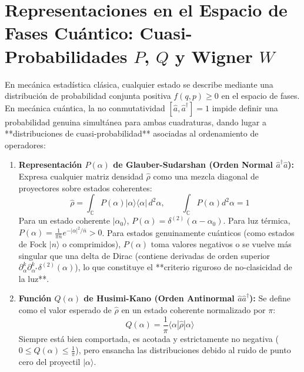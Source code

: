 \documentclass[11pt,a4paper]{book}
\begin{document}
\section[Representaciones cuánticas de fase]{Representaciones en el Espacio de Fases Cuántico: Cuasi-Probabilidades $P$, $Q$ y Wigner $W$}

En mecánica estadística clásica, cualquier estado se describe mediante una distribución de probabilidad conjunta positiva $f(q, p) \geq 0$ en el espacio de fases. En mecánica cuántica, la no conmutatividad $[\hat{a}, \hat{a}^\dagger]=1$ impide definir una probabilidad genuina simultánea para ambas cuadraturas, dando lugar a **distribuciones de cuasi-probabilidad** asociadas al ordenamiento de operadores:

\begin{enumerate}
    \item \textbf{Representación $P(\alpha)$ de Glauber-Sudarshan (Orden Normal $\hat{a}^\dagger \hat{a}$):}
    Expresa cualquier matriz densidad $\hat{\rho}$ como una mezcla diagonal de proyectores sobre estados coherentes:
    \begin{equation}
    \hat{\rho} = \int_{\mathbb{C}} P(\alpha) |\alpha\rangle\langle\alpha| \, d^2\alpha, \qquad \int_{\mathbb{C}} P(\alpha) d^2\alpha = 1
    \end{equation}
    Para un estado coherente $|\alpha_0\rangle$, $P(\alpha) = \delta^{(2)}(\alpha - \alpha_0)$. Para luz térmica, $P(\alpha) = \frac{1}{\pi\bar{n}}e^{-|\alpha|^2/\bar{n}} > 0$. Para estados genuinamente cuánticos (como estados de Fock $|n\rangle$ o comprimidos), $P(\alpha)$ toma valores negativos o se vuelve más singular que una delta de Dirac (contiene derivadas de orden superior $\partial_\alpha^k \partial_{\alpha^*}^k \delta^{(2)}(\alpha)$), lo que constituye el **criterio riguroso de no-clasicidad de la luz**.
    
    \item \textbf{Función $Q(\alpha)$ de Husimi-Kano (Orden Antinormal $\hat{a} \hat{a}^\dagger$):}
    Se define como el valor esperado de $\hat{\rho}$ en un estado coherente normalizado por $\pi$:
    \begin{equation}
    Q(\alpha) = \frac{1}{\pi} \langle \alpha | \hat{\rho} | \alpha \rangle
    \end{equation}
    Siempre está bien comportada, es acotada y estrictamente no negativa ($0 \leq Q(\alpha) \leq \frac{1}{\pi}$), pero ensancha las distribuciones debido al ruido de punto cero del proyectil $|\alpha\rangle$.
    

\end{enumerate}
\end{document}
